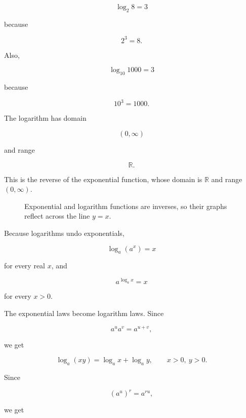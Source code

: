 \[
\log_2 8=3
\]

because

\[
2^3=8.
\]

Also,

\[
\log_{10} 1000=3
\]

because

\[
10^3=1000.
\]

The logarithm has domain

\[
(0,\infty)
\]

and range

\[
\mathbb R.
\]

This is the reverse of the exponential function, whose domain is \(\mathbb R\) and range \((0,\infty)\).

\begin{figure}[h]
\centering
{}
\caption{Exponential and logarithm functions are inverses, so their graphs reflect across the line \(y=x\).}
\label{fig:exp-log-inverses}
\end{figure}

Because logarithms undo exponentials,

\[
\log_a(a^x)=x
\]

for every real \(x\), and

\[
a^{\log_a x}=x
\]

for every \(x>0\).

The exponential laws become logarithm laws. Since

\[
a^u a^v=a^{u+v},
\]

we get

\[
\log_a(xy)=\log_a x+\log_a y,
\qquad x>0,\ y>0.
\]

Since

\[
(a^u)^r=a^{ru},
\]

we get

